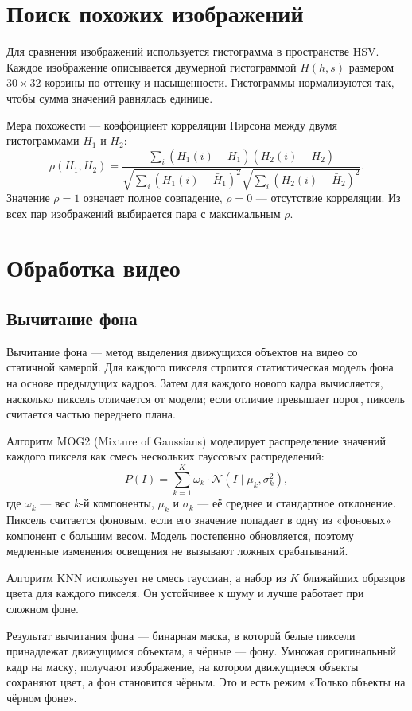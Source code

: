\documentclass[a4paper,12pt]{article}
\begin{document}
\section{Поиск похожих изображений}

Для сравнения изображений используется гистограмма в пространстве HSV. Каждое изображение описывается двумерной гистограммой $H(h, s)$ размером $30 \times 32$ корзины по оттенку и насыщенности. Гистограммы нормализуются так, чтобы сумма значений равнялась единице.

Мера похожести --- коэффициент корреляции Пирсона между двумя гистограммами $H_1$ и $H_2$:
\[
\rho(H_1, H_2) = \frac{\sum_i (H_1(i) - \bar{H}_1)(H_2(i) - \bar{H}_2)}{\sqrt{\sum_i (H_1(i) - \bar{H}_1)^2} \sqrt{\sum_i (H_2(i) - \bar{H}_2)^2}}.
\]
Значение $\rho = 1$ означает полное совпадение, $\rho = 0$ --- отсутствие корреляции. Из всех пар изображений выбирается пара с максимальным $\rho$.

\section{Обработка видео}

\subsection{Вычитание фона}

Вычитание фона --- метод выделения движущихся объектов на видео со статичной камерой. Для каждого пикселя строится статистическая модель фона на основе предыдущих кадров. Затем для каждого нового кадра вычисляется, насколько пиксель отличается от модели; если отличие превышает порог, пиксель считается частью переднего плана.

Алгоритм MOG2 (Mixture of Gaussians) моделирует распределение значений каждого пикселя как смесь нескольких гауссовых распределений:
\[
P(I) = \sum_{k=1}^{K} \omega_k \cdot \mathcal{N}(I \mid \mu_k, \sigma_k^2),
\]
где $\omega_k$ --- вес $k$-й компоненты, $\mu_k$ и $\sigma_k$ --- её среднее и стандартное отклонение. Пиксель считается фоновым, если его значение попадает в одну из «фоновых» компонент с большим весом. Модель постепенно обновляется, поэтому медленные изменения освещения не вызывают ложных срабатываний.

Алгоритм KNN использует не смесь гауссиан, а набор из $K$ ближайших образцов цвета для каждого пикселя. Он устойчивее к шуму и лучше работает при сложном фоне.

Результат вычитания фона --- бинарная маска, в которой белые пиксели принадлежат движущимся объектам, а чёрные --- фону. Умножая оригинальный кадр на маску, получают изображение, на котором движущиеся объекты сохраняют цвет, а фон становится чёрным. Это и есть режим «Только объекты на чёрном фоне».
\end{document}

